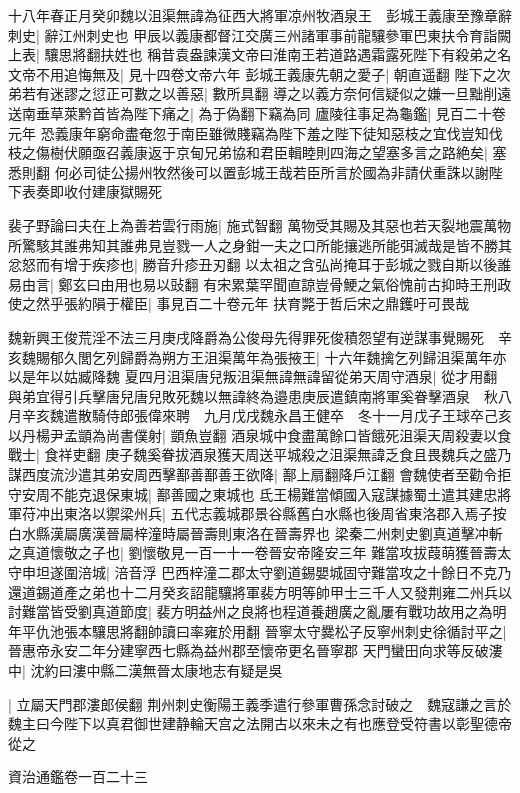 十八年春正月癸卯魏以沮渠無諱為征西大將軍凉州牧酒泉王　彭城王義康至豫章辭刺史|{
	辭江州刺史也}
甲辰以義康都督江交廣三州諸軍事前龍驤參軍巴東扶令育詣闕上表|{
	驤思將翻扶姓也}
稱昔袁盎諫漢文帝曰淮南王若道路遇霜露死陛下有殺弟之名文帝不用追悔無及|{
	見十四卷文帝六年}
彭城王義康先朝之愛子|{
	朝直遥翻}
陛下之次弟若有迷謬之愆正可數之以善惡|{
	數所具翻}
導之以義方奈何信疑似之嫌一旦黜削遠送南垂草萊黔首皆為陛下痛之|{
	為于偽翻下竊為同}
廬陵往事足為龜鑑|{
	見百二十卷元年}
恐義康年窮命盡奄忽于南臣雖微賤竊為陛下羞之陛下徒知惡枝之宜伐豈知伐枝之傷樹伏願亟召義康返于京甸兄弟協和君臣輯睦則四海之望塞多言之路絶矣|{
	塞悉則翻}
何必司徒公揚州牧然後可以置彭城王哉若臣所言於國為非請伏重誅以謝陛下表奏即收付建康獄賜死

裴子野論曰夫在上為善若雲行雨施|{
	施式智翻}
萬物受其賜及其惡也若天裂地震萬物所驚駭其誰弗知其誰弗見豈戮一人之身鉗一夫之口所能攘逃所能弭滅哉是皆不勝其忿怒而有增于疾疹也|{
	勝音升疹丑刃翻}
以太祖之含弘尚掩耳于彭城之戮自斯以後誰易由言|{
	鄭玄曰由用也易以䜴翻}
有宋累葉罕聞直諒豈骨鯁之氣俗愧前古抑時王刑政使之然乎張約隕于權臣|{
	事見百二十卷元年}
扶育斃于哲后宋之鼎鑊吁可畏哉

魏新興王俊荒淫不法三月庚戌降爵為公俊母先得罪死俊積怨望有逆謀事覺賜死　辛亥魏賜郁久閭乞列歸爵為朔方王沮渠萬年為張掖王|{
	十六年魏擒乞列歸沮渠萬年亦以是年以姑臧降魏}
夏四月沮渠唐兒叛沮渠無諱無諱留從弟天周守酒泉|{
	從才用翻}
與弟宜得引兵擊唐兒唐兒敗死魏以無諱終為邉患庚辰遣鎮南將軍奚眷擊酒泉　秋八月辛亥魏遣散騎侍郎張偉來聘　九月戊戌魏永昌王健卒　冬十一月戊子王球卒己亥以丹楊尹孟顗為尚書僕射|{
	顗魚豈翻}
酒泉城中食盡萬餘口皆餓死沮渠天周殺妻以食戰士|{
	食祥吏翻}
庚子魏奚眷拔酒泉獲天周送平城殺之沮渠無諱乏食且畏魏兵之盛乃謀西度流沙遣其弟安周西擊鄯善鄯善王欲降|{
	鄯上扇翻降戶江翻}
會魏使者至勸令拒守安周不能克退保東城|{
	鄯善國之東城也}
氐王楊難當傾國入寇謀據蜀土遣其建忠將軍苻冲出東洛以禦梁州兵|{
	五代志義城郡景谷縣舊白水縣也後周省東洛郡入焉子按白水縣漢屬廣漢晉屬梓潼時屬晉壽則東洛在晉壽界也}
梁秦二州刺史劉真道擊冲斬之真道懷敬之子也|{
	劉懷敬見一百一十一卷晉安帝隆安三年}
難當攻拔葭萌獲晉壽太守申坦遂圍涪城|{
	涪音浮}
巴西梓潼二郡太守劉道錫嬰城固守難當攻之十餘日不克乃還道錫道產之弟也十二月癸亥詔龍驤將軍裴方明等帥甲士三千人又發荆雍二州兵以討難當皆受劉真道節度|{
	裴方明益州之良將也程道養趙廣之亂屢有戰功故用之為明年平仇池張本驤思將翻帥讀曰率雍於用翻}
晉寧太守爨松子反寧州刺史徐循討平之|{
	晉惠帝永安二年分建寧西七縣為益州郡至懷帝更名晉寧郡}
天門蠻田向求等反破漊中|{
	沈約曰漊中縣二漢無晉太康地志有疑是吳}


|{
	立屬天門郡漊郎侯翻}
荆州刺史衡陽王義季遣行參軍曹孫念討破之　魏寇謙之言於魏主曰今陛下以真君御世建静輪天宫之法開古以來未之有也應登受符書以彰聖德帝從之

資治通鑑卷一百二十三
